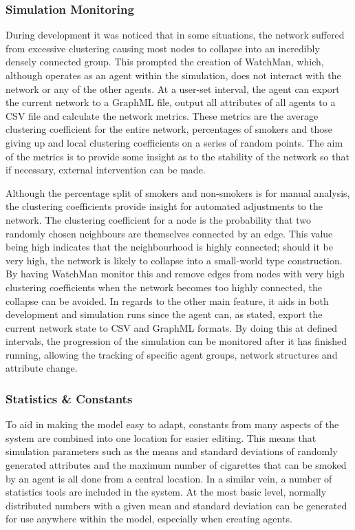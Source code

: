 \documentclass[]{report}
\begin{document}
\subsubsection{Simulation Monitoring}
During development it was noticed that in some situations, the network suffered from excessive clustering causing most nodes to collapse into an incredibly densely connected group. This prompted the creation of WatchMan, which, although operates as an agent within the simulation, does not interact with the network or any of the other agents. At a user-set interval, the agent can export the current network to a GraphML file, output all attributes of all agents to a CSV file and calculate the network metrics. These metrics are the average clustering coefficient for the entire network, percentages of smokers and those giving up and local clustering coefficients on a series of random points. The aim of the metrics is to provide some insight as to the stability of the network so that if necessary, external intervention can be made.

Although the percentage split of smokers and non-smokers is for manual analysis, the clustering coefficients provide insight for automated adjustments to the network. The clustering coefficient for a node is the probability that two randomly chosen neighbours are themselves connected by an edge\cite{NetMark-44-cluster}. This value being high indicates that the neighbourhood is highly connected; should it be very high, the network is likely to collapse into a small-world type construction. By having WatchMan monitor this and remove edges from nodes with very high clustering coefficients when the network becomes too highly connected, the collapse can be avoided. In regards to the other main feature, it aids in both development and simulation runs since the agent can, as stated, export the current network state to CSV and GraphML formats. By doing this at defined intervals, the progression of the simulation can be monitored after it has finished running, allowing the tracking of specific agent groups, network structures and attribute change. 

\subsubsection{Statistics \& Constants}
To aid in making the model easy to adapt, constants from many aspects of the system are combined into one location for easier editing. This means that simulation parameters such as the means and standard deviations of randomly generated attributes and the maximum number of cigarettes that can be smoked by an agent is all done from a central location. In a similar vein, a number of statistics tools are included in the system. At the most basic level, normally distributed numbers with a given mean and standard deviation can be generated for use anywhere within the model, especially when creating agents.
\end{document}
